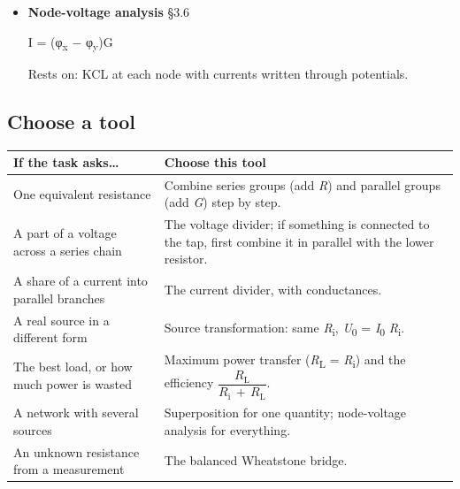\documentclass[11pt]{article}
\begin{document}
\begin{keepsection}
\begin{itemize}
sum of one-source solutions

Rests on: every network equation being linear.
\item {}
\textbf{Node-voltage analysis} \hfill{\small\color{FAUblue}§3.6}

I = (φ\textsubscript{x} \ensuremath{-} φ\textsubscript{y})G

Rests on: KCL at each node with currents written through potentials.
\end{itemize}

\begin{keepsection}
\subsection{Choose a tool}

\begin{center}\small\begin{tabularx}{\linewidth}{>{\raggedright\arraybackslash}X>{\raggedright\arraybackslash}X}\toprule
\textbf{If the task asks…} & \textbf{Choose this tool} \\ \midrule
One equivalent resistance & Combine series groups (add \textit{R}) and parallel groups (add \textit{G}) step by step. \\
A part of a voltage across a series chain & The voltage divider; if something is connected to the tap, first combine it in parallel with the lower resistor. \\
A share of a current into parallel branches & The current divider, with conductances. \\
A real source in a different form & Source transformation: same \textit{R}\textsubscript{i}, \textit{U}\textsubscript{0} = \textit{I}\textsubscript{0} \textit{R}\textsubscript{i}. \\
The best load, or how much power is wasted & Maximum power transfer (\textit{R}\textsubscript{L} = \textit{R}\textsubscript{i}) and the efficiency {\small\ensuremath{\dfrac{{R}_{\mathrm{L}}}{{R}_{\mathrm{i}}\, +\, {R}_{\mathrm{L}}}}}. \\
A network with several sources & Superposition for one quantity; node-voltage analysis for everything. \\
An unknown resistance from a measurement & The balanced Wheatstone bridge. \\
\bottomrule\end{tabularx}\end{center}
\end{keepsection}
\end{keepsection}
\end{document}
